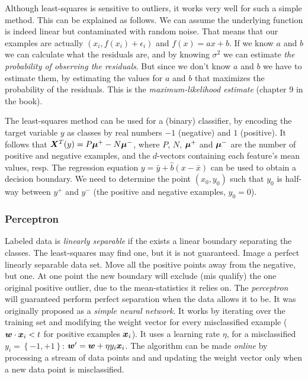 Although least-squares is sensitive to outliers, it works very well for such a simple method.
This can be explained as follows.
We can assume the underlying function is indeed linear but contaminated with random noise.
That means that our examples are actually $(x_i, f(x_i) + \epsilon_i)$ and $f(x) = ax + b$.
If we know $a$ and $b$ we can calculate what the residuals are, and by knowing $\sigma^2$ we can estimate \emph{the probability of observing the residuals}.
But since we don't know $a$ and $b$ we have to estimate them, by estimating the values for $a$ and $b$ that maximizes the probability of the residuals.
This is the \emph{maximum-likelihood estimate} (chapter 9 in the book).

The least-squares method can be used for a (binary) classifier, by encoding the target variable $y$ as classes by real numbers $-1$ (negative) and $1$ (positive).
It follows that $\matrixsym{X}^T\vectorsym(y) = P \vectorsym{\mu^+} - N \vectorsym{\mu^-}$, where $P$, $N$, $\vectorsym{\mu^+}$ and $\vectorsym{\mu^-}$ are the number of positive and negative examples, and the $d$-vectors containing each feature's mean values, resp.
The regression equation $y = \bar{y} + \hat{b}(x - \bar{x})$ can be used to obtain a decision boundary.
We need to determine the point $(x_0, y_0)$ such that $y_0$ is half-way between $y^+$ and $y^-$ (the positive and negative examples, \ie $y_0 = 0$).


\subsubsection{Perceptron}\label{perceptron}
Labeled data is \emph{linearly separable} if the exists a linear boundary separating the classes.
The least-squares may find one, but it is not guaranteed.
Image a perfect linearly separable data set.
Move all the positive points away from the negative, but one.
At one point the new boundary will exclude (mis qualify) the one original positive outlier, due to the mean-statistics it relies on.
The \emph{perceptron} will guaranteed perform perfect separation when the data allows it to be.
It was originally proposed as a \emph{simple neural network}.
It works by iterating over the training set and modifying the weight vector for every misclassified example ($\vectorsym{w} \cdot \vectorsym{x}_i < t$ for positive examples $\vectorsym{x}_i$).
It uses a learning rate $\eta$, for a misclassified $y_i = \left\{-1,+1\right\}$: $\vectorsym{w}' = \vectorsym{w} + \eta y_i \vectorsym{x}_i$.
The algorithm can be made \emph{online} by processing a stream of data points and and updating the weight vector only when a new data point is misclassified.

